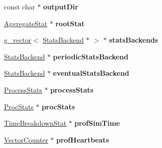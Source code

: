 \begin{DoxyCompactItemize}
\item 
\hypertarget{structGlobSimInfo_a6ed19e9a673b7c3fbcfb05aaab133338}{const char $\ast$ {\bfseries output\-Dir}}\label{structGlobSimInfo_a6ed19e9a673b7c3fbcfb05aaab133338}

\item 
\hypertarget{structGlobSimInfo_a25a955c156bd01663cd395baadd2fe37}{\hyperlink{classAggregateStat}{Aggregate\-Stat} $\ast$ {\bfseries root\-Stat}}\label{structGlobSimInfo_a25a955c156bd01663cd395baadd2fe37}

\item 
\hypertarget{structGlobSimInfo_ae1b5df84c2652783885401da8ea7a8a6}{\hyperlink{classg__vector}{g\-\_\-vector}$<$ \hyperlink{classStatsBackend}{Stats\-Backend} $\ast$ $>$ $\ast$ {\bfseries stats\-Backends}}\label{structGlobSimInfo_ae1b5df84c2652783885401da8ea7a8a6}

\item 
\hypertarget{structGlobSimInfo_a05c4de5bc5b2b075ec2f407897739c5a}{\hyperlink{classStatsBackend}{Stats\-Backend} $\ast$ {\bfseries periodic\-Stats\-Backend}}\label{structGlobSimInfo_a05c4de5bc5b2b075ec2f407897739c5a}

\item 
\hypertarget{structGlobSimInfo_a9cabbf77790fab1d6e3e5feb8d698928}{\hyperlink{classStatsBackend}{Stats\-Backend} $\ast$ {\bfseries eventual\-Stats\-Backend}}\label{structGlobSimInfo_a9cabbf77790fab1d6e3e5feb8d698928}

\item 
\hypertarget{structGlobSimInfo_a951105ddb8f5756790b9df3f456caffc}{\hyperlink{classProcessStats}{Process\-Stats} $\ast$ {\bfseries process\-Stats}}\label{structGlobSimInfo_a951105ddb8f5756790b9df3f456caffc}

\item 
\hypertarget{structGlobSimInfo_a081543291b2c02aad91ace9a734a2c6f}{\hyperlink{classProcStats}{Proc\-Stats} $\ast$ {\bfseries proc\-Stats}}\label{structGlobSimInfo_a081543291b2c02aad91ace9a734a2c6f}

\item 
\hypertarget{structGlobSimInfo_a68b25e136cb6049911cee9b72a36894b}{\hyperlink{classTimeBreakdownStat}{Time\-Breakdown\-Stat} $\ast$ {\bfseries prof\-Sim\-Time}}\label{structGlobSimInfo_a68b25e136cb6049911cee9b72a36894b}

\item 
\hypertarget{structGlobSimInfo_a138448e449c24e8e60dd5b487bb754aa}{\hyperlink{classVectorCounter}{Vector\-Counter} $\ast$ {\bfseries prof\-Heartbeats}}\label{structGlobSimInfo_a138448e449c24e8e60dd5b487bb754aa}


\end{DoxyCompactItemize}
